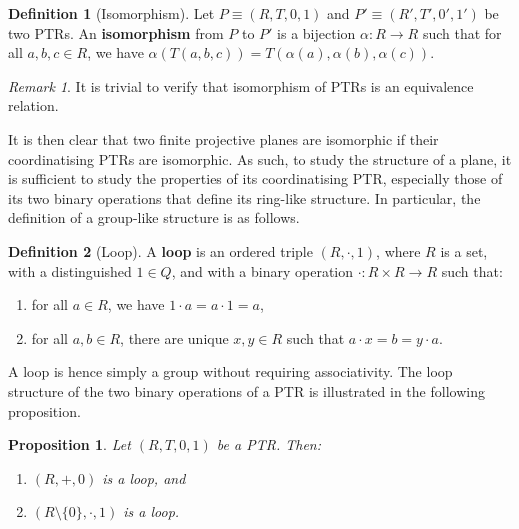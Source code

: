 \documentclass{report}
\newtheorem{proposition}[theorem]{Proposition}
\theoremstyle{definition}\newtheorem*{definition}{Definition}
\theoremstyle{definition}\newtheorem*{example}{Example}
\theoremstyle{remark}\newtheorem*{remark}{Remark}
\begin{document}
\begin{definition}[Isomorphism]
Let $ P \equiv (R, T, 0, 1) $ and $ P' \equiv (R', T', 0', 1') $ be two PTRs. An \textbf{isomorphism} from $ P $ to $ P' $ is a bijection $ \alpha : R \to R $ such that for all $ a, b, c \in R $, we have $ \alpha(T(a, b, c)) = T(\alpha(a), \alpha(b), \alpha(c)) $.
\end{definition}

\begin{remark}
It is trivial to verify that isomorphism of PTRs is an equivalence relation.
\end{remark}

It is then clear that two finite projective planes are isomorphic if their coordinatising PTRs are isomorphic. As such, to study the structure of a plane, it is sufficient to study the properties of its coordinatising PTR, especially those of its two binary operations that define its ring-like structure. In particular, the definition of a group-like structure is as follows.

\begin{definition}[Loop]
A \textbf{loop} is an ordered triple $ (R, \cdot, 1) $, where $ R $ is a set, with a distinguished $ 1 \in Q $, and with a binary operation $ \cdot : R \times R \to R $ such that:
\begin{enumerate}
  \item for all $ a \in R $, we have $ 1 \cdot a = a \cdot 1 = a $,
  \item for all $ a, b \in R $, there are unique $ x, y \in R $ such that $ a \cdot x = b = y \cdot a $.
\end{enumerate}
\end{definition}

A loop is hence simply a group without requiring associativity. The loop structure of the two binary operations of a PTR is illustrated in the following proposition.

\begin{proposition}
Let $ (R, T, 0, 1) $ be a PTR. Then:
\begin{enumerate}
  \item $ (R, +, 0) $ is a loop, and
  \item $ (R \setminus \{ 0 \}, \cdot, 1) $ is a loop.
\end{enumerate}
\end{proposition}
\end{document}
